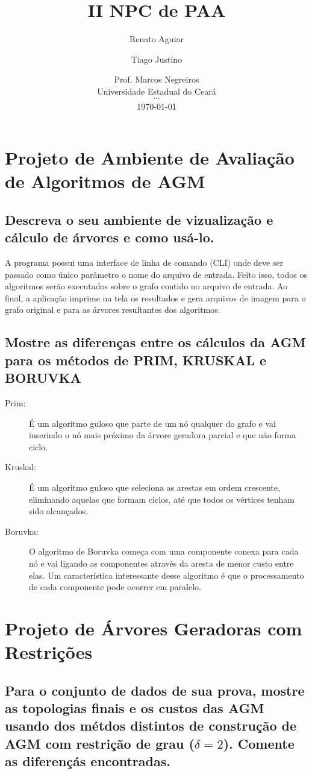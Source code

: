 \documentclass[12pt,a4paper]{article}
\title{II NPC de PAA}
\author{ Renato Aguiar \and Tiago Justino }
\date{
    Prof. Marcos Negreiros \\
	Universidade Estadual do Ceará \\
	$\cdots$ \\
	\today
}
\begin{document}
\maketitle

\section{Projeto de Ambiente de Avaliação de Algoritmos de AGM}
\subsection{Descreva o seu ambiente de vizualização e cálculo de árvores e como
usá-lo.}

A programa possui uma interface de linha de comando (CLI) onde deve ser passado
como único parâmetro o nome do arquivo de entrada. Feito isso, todos os
algoritmos serão executados sobre o grafo contido no arquivo de entrada. Ao
final, a aplicação imprime na tela os resultados e gera arquivos de imagem para
o grafo original e para as árvores resultantes dos algoritmos.

\subsection{Mostre as diferenças entre os cálculos da AGM para os métodos de
PRIM, KRUSKAL e BORUVKA}

\begin{description}
\item[Prim:] É um algoritmo guloso que parte de um nó qualquer do grafo e vai
inserindo o nó mais próximo da árvore geradora parcial e que não forma ciclo.
\item[Kruskal:] É um algoritmo guloso que seleciona as arestas em ordem crescente,
eliminando aquelas que formam ciclos, até que todos os vértices tenham sido
alcançados.
\item[Boruvka:] O algoritmo de Boruvka começa com uma componente conexa para
cada nó e vai ligando as componentes através da aresta de menor custo entre
elas. Um característica interessante desse algoritmo é que o processamento de
cada componente pode ocorrer em paralelo.
\end{description}

\section{Projeto de Árvores Geradoras com Restrições}

\subsection{Para o conjunto de dados de sua prova, mostre as topologias finais e
os custos das AGM usando dos métdos distintos de construção de AGM com restrição
de grau ($\delta=2$). Comente as diferençás encontradas.}
\end{document}
